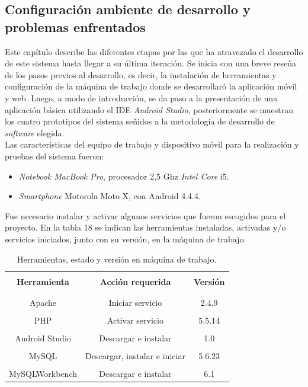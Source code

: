 \subsection{Configuración ambiente de desarrollo y problemas enfrentados}

Este capítulo describe las diferentes etapas por las que ha atravezado el desarrollo de este sistema hasta llegar a su última iteración. Se inicia con una breve reseña de los pasos previos al desarrollo, es decir, la instalación de herramientas y configuración de la máquina de trabajo donde se desarrollaró la aplicación móvil y web. Luego, a modo de introducción, se da paso a la presentación de una aplicación básica utilizando el IDE \textit{Android Studio}, posteriormente se muestran los cuatro prototipos del sistema señidos a la metodología de desarrollo de \textit{software} elegida.\\

Las características del equipo de trabajo y dispositivo móvil para la realización y pruebas del sistema fueron:

\begin{itemize}
\item \textit{Notebook MacBook Pro}, procesador 2,5 Ghz \textit{Intel Core} i5.
\item \textit{Smartphone} Motorola Moto X, con Android 4.4.4.
\end{itemize}

Fue necesario instalar y activar algunos servicios que fueron escogidos para el proyecto. En la tabla 18 se indican las herramientas instaladas, activadas y/o servicios iniciados, junto con su versión, en la máquina de trabajo.

\begin{spacing}{1.0}
	\begin{table}[H]
		\centering
		\caption{Herramientas, estado y versión en máquina de trabajo.} 
		\begin{tabular}{|c|c|c|}
			\hline 
			\rowcolor{gray!30} &&\\
			\rowcolor{gray!30} \textbf{Herramienta} & \textbf{Acción requerida} & \textbf{Versión} \\ 
			\rowcolor{gray!30} &&\\
			\hline 
			&&\\[-0.2cm]
			Apache & Iniciar servicio & 2.4.9\\
			\hline 
			&&\\[-0.2cm]
			PHP & Activar servicio & 5.5.14 \\
			\hline 
			&&\\[-0.2cm]
			Android Studio & Descargar e instalar & 1.0 \\
			\hline 
			&&\\[-0.2cm]
			MySQL & Descargar, instalar e iniciar & 5.6.23 \\
			\hline 
			&&\\[-0.2cm]
			MySQLWorkbench & Descargar e instalar & 6.1 \\
			\hline			
		\end{tabular}
		\label{ambienteDesarrollo}
	\end{table}
\end{spacing}

